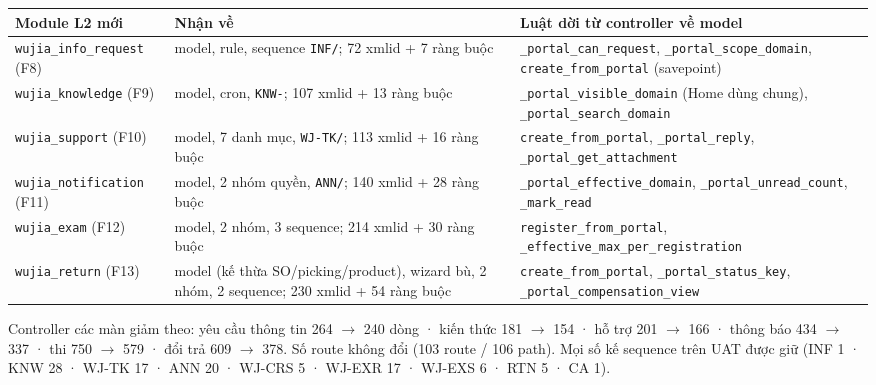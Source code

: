 \begin{center}
\footnotesize
\begin{tabularx}{\textwidth}{>{\raggedright\arraybackslash}p{2.5cm}>{\raggedright\arraybackslash}p{4.4cm}>{\raggedright\arraybackslash}X}
\toprule
Module L2 mới & Nhận về & Luật dời từ controller về model \\
\midrule
\texttt{wujia\_info\_request} (F8) & 1 model, rule, sequence \texttt{INF/}; 72 xmlid + 7 ràng buộc &
  \texttt{\_portal\_can\_request}, \texttt{\_portal\_scope\_domain}, \texttt{create\_from\_portal} (savepoint) \\
\texttt{wujia\_knowledge} (F9) & 3 model, cron, \texttt{KNW-}; 107 xmlid + 13 ràng buộc &
  \texttt{\_portal\_visible\_domain} (Home dùng chung), \texttt{\_portal\_search\_domain} \\
\texttt{wujia\_support} (F10) & 2 model, 7 danh mục, \texttt{WJ-TK/}; 113 xmlid + 16 ràng buộc &
  \texttt{create\_from\_portal}, \texttt{\_portal\_reply}, \texttt{\_portal\_get\_attachment} \\
\texttt{wujia\_notification} (F11) & 3 model, 2 nhóm quyền, \texttt{ANN/}; 140 xmlid + 28 ràng buộc &
  \texttt{\_portal\_effective\_domain}, \texttt{\_portal\_unread\_count}, \texttt{\_mark\_read} \\
\texttt{wujia\_exam} (F12) & 5 model, 2 nhóm, 3 sequence; 214 xmlid + 30 ràng buộc &
  \texttt{register\_from\_portal}, \texttt{\_effective\_max\_per\_registration} \\
\texttt{wujia\_return} (F13) & 6 model (kế thừa SO/picking/product), wizard bù, 2 nhóm, 2 sequence; 230 xmlid + 54 ràng buộc &
  \texttt{create\_from\_portal}, \texttt{\_portal\_status\_key}, \texttt{\_portal\_compensation\_view} \\
\bottomrule
\end{tabularx}
\end{center}

Controller các màn giảm theo: yêu cầu thông tin 264 $\to$ 240 dòng · kiến thức 181 $\to$ 154 · hỗ trợ 201 $\to$ 166 ·
thông báo 434 $\to$ 337 · thi 750 $\to$ 579 · đổi trả 609 $\to$ 378. Số route không đổi (103 route / 106 path).
Mọi số kế sequence trên UAT được giữ (INF 1 · KNW 28 · WJ-TK 17 · ANN 20 · WJ-CRS 5 · WJ-EXR 17 · WJ-EXS 6 · RTN 5 · CA 1).

